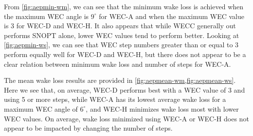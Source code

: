 \documentclass[a4paper]{jpconf}
\begin{document}
%
From \cref{fig:aepmin-wm}, we can see that the minimum wake loss is achieved when the maximum WEC angle is $9^\circ$ for WEC-A and when the maximum WEC value is 3 for WEC-D and WEC-H. It also appears that while WECC generally out performs SNOPT alone, lower WEC values tend to perform better. Looking at \cref{fig:aepmin-ws}, we can see that WEC step numbers greater than or equal to 3 perform equally well for WEC-D and WEC-H, but there does not appear to be a clear relation between minimum wake loss and number of steps for WEC-A.

The mean wake loss results are provided in \cref{fig:aepmean-wm,fig:aepmean-ws}. Here we see that, on average, WEC-D performs best with a WEC value of 3 and using 5 or more steps, while WEC-A has its lowest average wake loss for a maximum WEC angle of $6^\circ$, and WEC-H minimizes wake loss most with lower WEC values. On average, wake loss minimized using WEC-A or WEC-H does not appear to be impacted by changing the number of steps.
\end{document}
